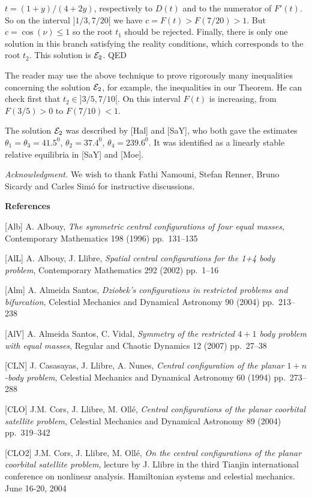 \documentclass[11pt]{article}
\begin{document}
{$t=(1+y)/(4+2y)$, respectively to $D(t)$ and to the
numerator of $F'(t)$. So on the interval $]1/3,7/20[$ we have
$c=F(t)>F(7/20)>1$. But $c=\cos(\nu)\leq 1$ so the root $t_1$ should
be rejected. Finally, there is only one solution in this branch satisfying the reality conditions,
which corresponds to the root $t_2$. This solution is ${\cal E}_2$. QED

The reader may use the above technique to prove rigorously many inequalities concerning the solution ${\cal E}_2$, for example, the inequalities in our Theorem. He can check first that $t_2 \in
]3/5,7/10[$. On this interval $F(t)$ is increasing, from $F(3/5)>0$  to $F(7/10)<1$.

The solution ${\cal E}_2$ was described by [Hal] and [SaY], who both gave the estimates $\theta_1=\theta_3=41.5^0$, $\theta_2=37.4^0$, $\theta_4=239.6^0$. It was identified as a linearly stable relative equilibria in [SaY] and [Moe].

{\sl Acknowledgment.} We wish to thank Fathi Namouni, Stefan Renner, Bruno Sicardy and Carles Sim\'o for instructive discussions.

\bigskip

\centerline{\bf References}


[Alb] A. Albouy, {\sl The symmetric central configurations of four equal masses}, Contemporary Mathematics 198 (1996) pp.\ 131--135

[AlL] A. Albouy, J. Llibre, {\sl Spatial central configurations for the 1+4 body problem}, Contemporary Mathematics 292 (2002) pp.\ 1--16

[Alm] A. Almeida Santos, {\sl  Dziobek's configurations in
restricted problems and bifurcation}, Celestial Mechanics and Dynamical
Astronomy 90 (2004) pp.\ 213--238

[AlV] A. Almeida Santos, C. Vidal, {\sl Symmetry of the restricted $4+1$ body problem with equal masses}, Regular and Chaotic Dynamics 12 (2007) pp.\ 27--38

[CLN] J. Casasayas, J. Llibre, A. Nunes, {\sl Central configuration of the planar $1+n$-body problem}, Celestial Mechanics and Dynamical Astronomy 60 (1994) pp.\ 273--288

[CLO] J.M. Cors, J. Llibre, M. Oll\'e, {\sl Central configurations of the planar coorbital satellite problem}, Celestial Mechanics and Dynamical Astronomy 89 (2004) pp.\ 319--342

[CLO2] J.M. Cors, J. Llibre, M. Oll\'e, {\sl On the central configurations of the planar coorbital satellite problem}, lecture by J. Llibre in the third Tianjin international conference on nonlinear analysis. Hamiltonian systems and celestial mechanics. June 16-20, 2004

}
\end{document}
